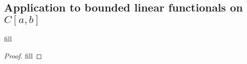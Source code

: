 \subsection{Application to bounded linear functionals on $C[a,b]$}

\begin{exercise}{1}
fill
\end{exercise}
\begin{proof}
fill
\end{proof}